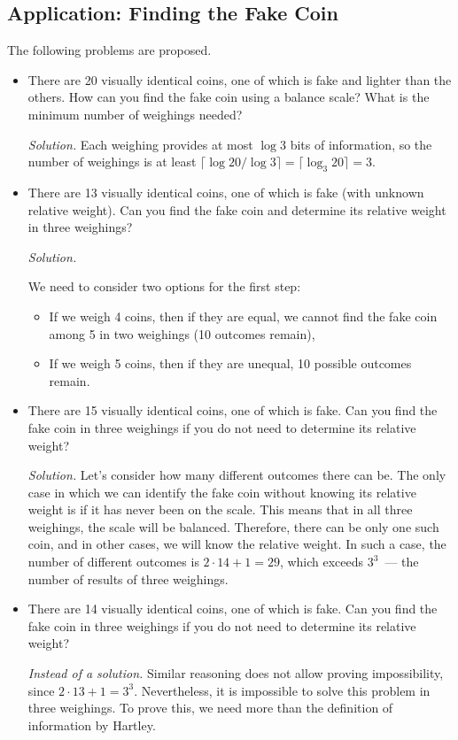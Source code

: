 \documentclass[12pt,sans]{article}
\theoremstyle{definition}
\theoremstyle{plain}
\theoremstyle{remark}
\newenvironment{solution}{%
    \begin{solutionblock}\emph{Solution.}
    }{%
    \end{solutionblock}
}}
\begin{document}
\subsection{Application: Finding the Fake Coin}
The following problems are proposed.
\begin{itemize}
    \item There are 20 visually identical coins, one of which is fake and lighter than the others.
    How can you find the fake coin using a balance scale? What is the minimum number of weighings needed?

    \textit{Solution.} Each weighing provides at most \(\log 3\) bits of information, so the number of weighings is at least $\lceil\log 20 / \log 3\rceil = \lceil\log_3 20\rceil = 3$.

    \item There are 13 visually identical coins, one of which is fake (with unknown relative weight).
    Can you find the fake coin and determine its relative weight in three weighings?

    \begin{solution}
        We need to consider two options for the first step:
    \begin{itemize}
        \item If we weigh 4 coins, then if they are equal, we cannot find the fake coin among 5 in two weighings (10 outcomes remain),
        \item If we weigh 5 coins, then if they are unequal, 10 possible outcomes remain.
    \end{itemize}
    \end{solution}

    \item There are 15 visually identical coins, one of which is fake. Can you find the fake coin in three weighings
    if you do not need to determine its relative weight?

    \textit{Solution.} Let's consider how many different outcomes there can be. The only case in which we can identify the fake coin without knowing its relative weight is if it has never been on the scale. This means that in all three weighings, the scale will be balanced. Therefore, there can be only one such coin, and in other cases, we will know the relative weight. In such a case, the number of different outcomes is \(2\cdot 14 + 1 = 29\), which exceeds \(3^3\)~— the number of results of three weighings.

    \item There are 14 visually identical coins, one of which is fake. Can you find the fake coin in three weighings
    if you do not need to determine its relative weight?

    \textit{Instead of a solution.} Similar reasoning does not allow proving impossibility, since \(2\cdot 13 + 1 = 3^3\).
    Nevertheless, it is impossible to solve this problem in three weighings. To prove this, we need more than
    the definition of information by Hartley.

\end{itemize}
\end{document}
